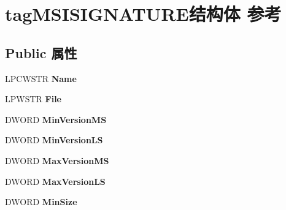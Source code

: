 \hypertarget{structtag_m_s_i_s_i_g_n_a_t_u_r_e}{}\section{tag\+M\+S\+I\+S\+I\+G\+N\+A\+T\+U\+R\+E结构体 参考}
\label{structtag_m_s_i_s_i_g_n_a_t_u_r_e}
\subsection*{Public 属性}
\begin{DoxyCompactItemize}
\item 
\mbox{\label{structtag_m_s_i_s_i_g_n_a_t_u_r_e_a145018f9175e84ae24abb1e7a189b403}} 
L\+P\+C\+W\+S\+TR {\bfseries Name}
\item 
\mbox{\label{structtag_m_s_i_s_i_g_n_a_t_u_r_e_aba9106d2e00bebd137fc47725af43364}} 
L\+P\+W\+S\+TR {\bfseries File}
\item 
\mbox{\label{structtag_m_s_i_s_i_g_n_a_t_u_r_e_aadc6a10dcc383f27b8d28fbc6b200796}} 
D\+W\+O\+RD {\bfseries Min\+Version\+MS}
\item 
\mbox{\label{structtag_m_s_i_s_i_g_n_a_t_u_r_e_ad60707cb89489e1cc82a7e78d966e71d}} 
D\+W\+O\+RD {\bfseries Min\+Version\+LS}
\item 
\mbox{\label{structtag_m_s_i_s_i_g_n_a_t_u_r_e_a95e581be5b7fef903c34c4e3d265651e}} 
D\+W\+O\+RD {\bfseries Max\+Version\+MS}
\item 
\mbox{\label{structtag_m_s_i_s_i_g_n_a_t_u_r_e_affd12b4bf5fcacdc828ee8e2ae9306ef}} 
D\+W\+O\+RD {\bfseries Max\+Version\+LS}
\item 
\mbox{\label{structtag_m_s_i_s_i_g_n_a_t_u_r_e_a9082762ff165b70aa521758a5055b62a}} 
D\+W\+O\+RD {\bfseries Min\+Size}
\item 
\mbox{\label{structtag_m_s_i_s_i_g_n_a_t_u_r_e_acc02c376d2bb59e63c45af848f4d1811}} 

\end{DoxyCompactItemize}
